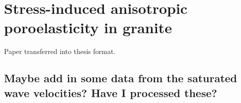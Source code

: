 \chapter{Stress-induced anisotropic poroelasticity in granite}
\label{chapterlabel3}

Paper transferred into thesis format.

\section{Maybe add in some data from the saturated wave velocities? Have I processed these?}

